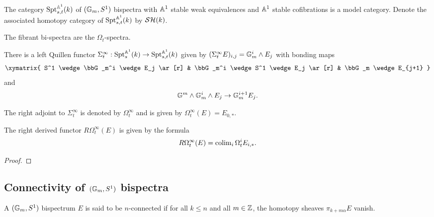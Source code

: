 \documentclass{amsart}%
\begin{document}
\begin{proposition}
  The category $\mathrm{Spt}_{s,t}^{\mathbb{A}^1}(k)$ of $(\mathbb{G}_m, S^1)$ bispectra with
  $\mathbb{A}^1$ stable weak equivalences and $\mathbb{A}^1$ stable cofibrations
  is a model category. Denote the associated homotopy category of
  $\mathrm{Spt}_{s,t}^{\mathbb{A}^1}(k)$ by $\mathcal{SH}(k)$.
\end{proposition}

\begin{proposition}
  The fibrant bi-spectra are the $\Omega_t$-spectra. \cite[Theorem
  3.4]{H-Spectra}
\end{proposition}

\begin{proposition}
  There is a left Quillen functor
  $\Sigma^{\infty}_t : \mathrm{Spt}_s^{\mathbb{A}^1}(k) \to \mathrm{Spt}_{s,t}^{\mathbb{A}^1}(k)$
  given by $(\Sigma^{\infty}_tE)_{i,j} = \mathbb{G}_m^i\wedge E_j$ with bonding maps 
  \begin{equation*}
    \xymatrix{
      S^1 \wedge \bbG_m^i \wedge E_j \ar[r] & \bbG_m^i \wedge S^1 \wedge E_j \ar[r] & \bbG_m \wedge E_{j+1}
    }
  \end{equation*}
  and 
  \begin{equation*}
    \mathbb{G}^m \wedge \mathbb{G}_m^i \wedge E_j \to \mathbb{G}_m^{i+1} E_j.
  \end{equation*}

  The right adjoint to $\Sigma^{\infty}_t$ is denoted by
  $\Omega^{\infty}_t$ and is given by
  $\Omega^{\infty}_t(E) = E_{0,*}$.

  The right derived functor $R\Omega^{\infty}_t(E)$ is given by the formula 
  \begin{equation*}
    R\Omega^{\infty}_t(E) = \operatorname{colim}_i \Omega_t^i E_{i,*}.
  \end{equation*}
\end{proposition}

\begin{proof}
  
\end{proof}

\subsection{Connectivity of $(\mathbb{G}_m, S^1)$ bispectra}

\begin{definition}
  A $(\mathbb{G}_m, S^1)$ bispectrum $E$ is said to be $n$-connected if for
  all $k\leq n$ and all $m \in \mathbb{Z}$, the homotopy sheaves
  $\pi_{k + m\alpha}E$ vanish.
\end{definition}
\end{document}
